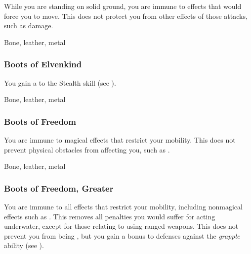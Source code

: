 While you are standing on solid ground, you are immune to effects that would force you to move.
This does not protect you from other effects of those attacks, such as damage.



 


 Bone, leather, metal


\lowercase{\hypertarget{item:Boots of Elvenkind}{}}\label{item:Boots of Elvenkind}
\hypertarget{item:Boots of Elvenkind}{\subsubsection{Boots of Elvenkind\hfill{}}}

You gain a   to the Stealth skill (see ).



 Bone, leather, metal


\lowercase{\hypertarget{item:Boots of Freedom}{}}\label{item:Boots of Freedom}
\hypertarget{item:Boots of Freedom}{\subsubsection{Boots of Freedom\hfill{}}}

You are immune to magical effects that restrict your mobility.
This does not prevent physical obstacles from affecting you, such as .



 Bone, leather, metal


\lowercase{\hypertarget{item:Boots of Freedom, Greater}{}}\label{item:Boots of Freedom, Greater}
\hypertarget{item:Boots of Freedom, Greater}{\subsubsection{Boots of Freedom, Greater\hfill{}}}

You are immune to all effects that restrict your mobility, including nonmagical effects such as .
This removes all penalties you would suffer for acting underwater, except for those relating to using ranged weapons.
This does not prevent you from being \grappled, but you gain a  bonus to defenses against the \textit{grapple} ability (see ).



